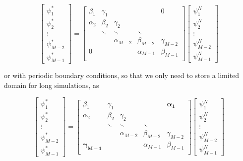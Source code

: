 \documentclass[10pt, a4paper]{article}
\begin{document}
\begin{equation*}
\begin{bmatrix}\psi_{1}^*\\\psi_{2}^*\\ \vdots \\\psi_{M-2}^*\\\psi_{M-1}^*\end{bmatrix} =
\begin{bmatrix}\beta_1&\gamma_1&&&0\\ \alpha_2&\beta_2&\gamma_2\\ &\ddots&\ddots&\ddots\\&&\alpha_{M-2}&\beta_{M-2}&\gamma_{M-2}\\0&&&\alpha_{M-1}&\beta_{M-1}\\ \end{bmatrix}
\begin{bmatrix}\psi_{1}^N\\\psi_{2}^N\\ \vdots \\\psi_{M-2}^N\\\psi_{M-1}^N\end{bmatrix}
\end{equation*}

or with periodic boundary conditions, so that we only need to store a limited domain for long simulations, as

\begin{equation*}
\begin{bmatrix}\psi_{1}^*\\\psi_{2}^*\\ \vdots \\\psi_{M-2}^*\\\psi_{M-1}^*\end{bmatrix} =\begin{bmatrix}\beta_1&\gamma_1&&&\mathbf{\alpha_1}\\ \alpha_2&\beta_2&\gamma_2\\ &\ddots&\ddots&\ddots\\&&\alpha_{M-2}&\beta_{M-2}&\gamma_{M-2}\\ \mathbf{\gamma_{M-1}}&&&\alpha_{M-1}&\beta_{M-1}\\ \end{bmatrix}
\begin{bmatrix}\psi_{1}^N\\\psi_{2}^N\\ \vdots \\\psi_{M-2}^N\\\psi_{M-1}^N\end{bmatrix}
\end{equation*}
\end{document}
